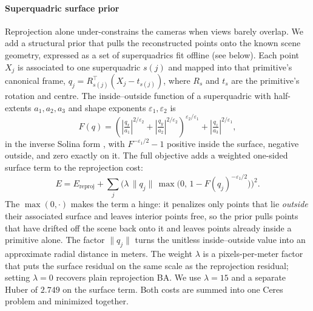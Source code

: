 \paragraph{Superquadric surface prior}
Reprojection alone under-constrains the cameras when views barely overlap. We add a structural prior that pulls the reconstructed points onto the known scene geometry, expressed as a set of superquadrics \cite{Paschalidou2019CVPR, fedele2026superdec3dscenedecomposition} fit offline (see below). Each point $X_j$ is associated to one superquadric $s(j)$ and mapped into that primitive's canonical frame, $q_j = R_{s(j)}^{\top}(X_j - t_{s(j)})$, where $R_s$ and $t_s$ are the primitive's rotation and centre. The inside--outside function of a superquadric with half-extents $a_1, a_2, a_3$ and shape exponents $\varepsilon_1, \varepsilon_2$ is
\begin{equation}
F(q) = \left( \left|\tfrac{q_x}{a_1}\right|^{2/\varepsilon_2} + \left|\tfrac{q_y}{a_2}\right|^{2/\varepsilon_2} \right)^{\varepsilon_2/\varepsilon_1} + \left|\tfrac{q_z}{a_3}\right|^{2/\varepsilon_1},
\end{equation}
in the inverse Solina form \cite{article}, with $F^{-\varepsilon_1/2}-1$ positive inside the surface, negative outside, and zero exactly on it. The full objective adds a weighted one-sided surface term to the reprojection cost:
\begin{equation}
E = E_{\text{reproj}} + \sum_{j} \Big( \lambda\, \lVert q_j \rVert\, \max\!\big(0,\, 1 - F(q_j)^{-\varepsilon_1/2} \big) \Big)^2 .
\end{equation}
The $\max(0,\cdot)$ makes the term a hinge: it penalizes only points that lie \emph{outside} their associated surface and leaves interior points free, so the prior pulls points that have drifted off the scene back onto it and leaves points already inside a primitive alone. The factor $\lVert q_j \rVert$ turns the unitless inside--outside value into an approximate radial distance in meters. The weight $\lambda$ is a pixels-per-meter factor that puts the surface residual on the same scale as the reprojection residual; setting $\lambda=0$ recovers plain reprojection BA. We use $\lambda=15$ and a separate Huber of $2.749$ on the surface term. Both costs are summed into one Ceres problem and minimized together.

